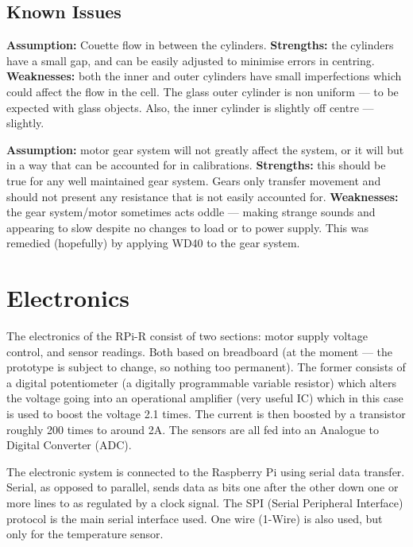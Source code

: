 \documentclass{report}
\begin{document}
			\subsection*{Known Issues}
				\textbf{Assumption:} Couette flow in between the cylinders. \textbf{Strengths:} the cylinders have a small gap, and can be easily adjusted to minimise errors in centring. \textbf{Weaknesses:} both the inner and outer cylinders have small imperfections which could affect the flow in the cell. The glass outer cylinder is non uniform --- to be expected with glass objects. Also, the inner cylinder is slightly off centre --- slightly.
				
				\textbf{Assumption:} motor gear system will not greatly affect the system, or it will but in a way that can be accounted for in calibrations. \textbf{Strengths:} this should be true for any well maintained gear system. Gears only transfer movement and should not present any resistance that is not easily accounted for. \textbf{Weaknesses:} the gear system/motor sometimes acts oddle --- making strange sounds and appearing to slow despite no changes to load or to power supply. This was remedied (hopefully) by applying WD40 to the gear system.
			
		\section{Electronics}
		
			The electronics of the RPi-R consist of two sections: motor supply voltage control, and sensor readings. Both based on breadboard (at the moment --- the prototype is subject to change, so nothing too permanent). The former consists of a digital potentiometer (a digitally programmable variable resistor) which alters the voltage going into an operational amplifier (very useful IC) which in this case is used to boost the voltage 2.1 times. The current is then boosted by a transistor roughly 200 times to around 2A. The sensors are all fed into an Analogue to Digital Converter (ADC).
			
			The electronic system is connected to the Raspberry Pi using serial data transfer. Serial, as opposed to parallel, sends data as bits one after the other down one or more lines to as regulated by a clock signal. The SPI (Serial Peripheral Interface) protocol is the main serial interface used. One wire (1-Wire) is also used, but only for the temperature sensor.
			
\end{document}
